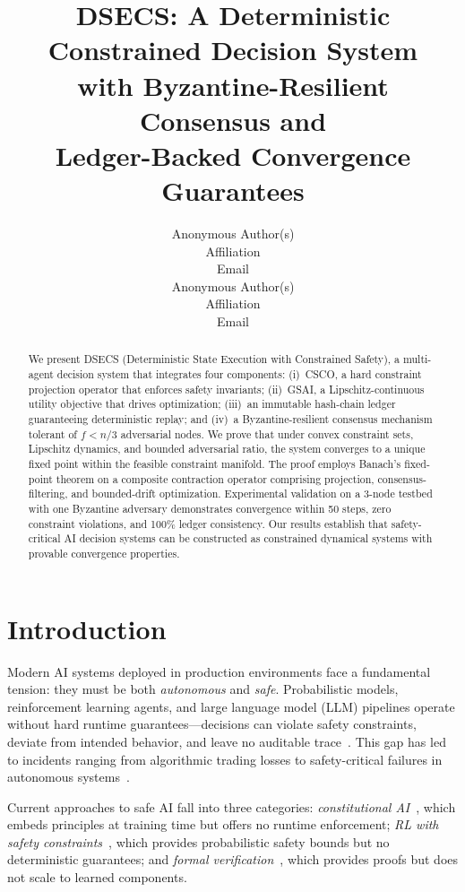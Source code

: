 \documentclass[11pt,letterpaper]{article}
\title{DSECS: A Deterministic Constrained Decision System\\
with Byzantine-Resilient Consensus and\\
Ledger-Backed Convergence Guarantees}
\author{Anonymous Author(s)\\
Affiliation\\
Email\\
\And
Anonymous Author(s)\\
Affiliation\\
Email\\
}
\begin{document}
\maketitle

\begin{abstract}
We present DSECS (Deterministic State Execution with Constrained Safety), a
multi-agent decision system that integrates four components:
(i)~CSCO, a hard constraint projection operator that enforces safety invariants;
(ii)~GSAI, a Lipschitz-continuous utility objective that drives optimization;
(iii)~an immutable hash-chain ledger guaranteeing deterministic replay; and
(iv)~a Byzantine-resilient consensus mechanism tolerant of $f < n/3$
adversarial nodes.
We prove that under convex constraint sets, Lipschitz dynamics, and bounded
adversarial ratio, the system converges to a unique fixed point within the
feasible constraint manifold. The proof employs Banach's fixed-point theorem
on a composite contraction operator comprising projection,
consensus-filtering, and bounded-drift optimization. Experimental validation
on a 3-node testbed with one Byzantine adversary demonstrates convergence
within 50 steps, zero constraint violations, and 100\% ledger consistency.
Our results establish that safety-critical AI decision systems can be
constructed as constrained dynamical systems with provable convergence
properties.
\end{abstract}

\section{Introduction}

Modern AI systems deployed in production environments face a fundamental
tension: they must be both \emph{autonomous} and \emph{safe}.
Probabilistic models, reinforcement learning agents, and large language model
(LLM) pipelines operate without hard runtime guarantees---decisions can
violate safety constraints, deviate from intended behavior, and leave no
auditable trace~\cite{amodei2016concrete,hendrycks2021aligning}.
This gap has led to incidents ranging from algorithmic trading losses to
safety-critical failures in autonomous systems~\cite{euristen2022}.

Current approaches to safe AI fall into three categories:
\textit{constitutional AI}~\cite{bai2022constitutional}, which embeds
principles at training time but offers no runtime enforcement;
\textit{RL with safety constraints}~\cite{achiam2017constrained,
garcia2015comprehensive}, which provides probabilistic safety bounds but no
deterministic guarantees; and \textit{formal verification}~\cite{alur2015principles},
which provides proofs but does not scale to learned components.
\end{document}
